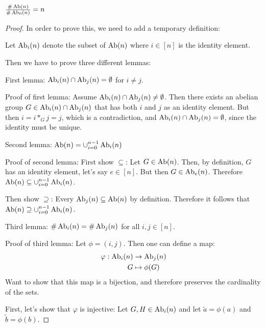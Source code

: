 \begin{theorem}
    \( \frac{\#\operatorname{Ab}(n)}{\#\operatorname{Ab}_0(n)} = n \)
\end{theorem}
\begin{proof}
    In order to prove this, we need to add a temporary definition:

    Let \( \operatorname{Ab}_i(n) \) denote the subset of \( \operatorname{Ab}(n) \) where \( i \in [n] \) is the identity element.

    Then we have to prove three different lemmas:

    First lemma: \( \operatorname{Ab}_i(n) \cap \operatorname{Ab}_j(n) = \emptyset \) for \( i \neq j \).

    Proof of first lemma: Assume \( \operatorname{Ab}_i(n) \cap \operatorname{Ab}_j(n) \neq \emptyset \). Then there exists an abelian group \( G \in \operatorname{Ab}_i(n) \cap \operatorname{Ab}_j(n) \) that has both \( i \) and \( j \) as an identity element. But then \( i = i *_G j = j \), which is a contradiction, and \( \operatorname{Ab}_i(n) \cap \operatorname{Ab}_j(n) = \emptyset \), since the identity must be unique.

    Second lemma: \( \operatorname{Ab}(n) = \cup_{i=0}^{n-1} \operatorname{Ab}_i(n) \)

    Proof of second lemma: First show \( \subseteq \): Let \( G \in \operatorname{Ab}(n) \). Then, by definition, \( G \) has an identity element, let's say \( e \in [n] \). But then \( G \in \operatorname{Ab}_e(n) \). Therefore \( \operatorname{Ab}(n) \subseteq \cup_{i=0}^{n-1} \operatorname{Ab}_i(n) \).

    Then show \( \supseteq \): Every \( \operatorname{Ab}_j(n) \subseteq \operatorname{Ab}(n) \) by definition. Therefore it follows that \( \operatorname{Ab}(n) \supseteq \cup_{i=0}^{n-1} \operatorname{Ab}_i(n) \).

    Third lemma: \( \#\operatorname{Ab}_i(n) = \#\operatorname{Ab}_j(n) \) for all \( i, j \in [n] \).

    Proof of third lemma: Let \( \phi = (i, j) \). Then one can define a map:
    \begin{align*}
        \varphi: \operatorname{Ab}_i(n) &\to \operatorname{Ab}_j(n) \\
        G &\mapsto \phi(G)
    \end{align*}
    Want to show that this map is a bijection, and therefore preserves the cardinality of the sets.

    First, let's show that \( \varphi \) is injective: Let \( G, H \in \operatorname{Ab}_i(n) \) and let \( \tilde{a} = \phi(a) \) and \( \tilde{b} = \phi(b) \).


\end{proof}
